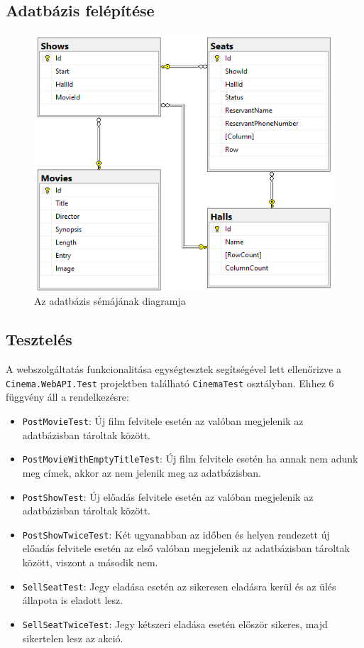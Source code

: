 \documentclass{article}
\begin{document}
	\subsection*{Adatbázis felépítése}
	\begin{figure}[H]
		\centering
				\includegraphics[width=\textwidth]{database}
		\caption{Az adatbázis sémájának diagramja}
	\end{figure}
	\subsection*{Tesztelés}
	A webszolgáltatás funkcionalitása egységtesztek segítségével lett ellenőrizve a \texttt{Cinema.WebAPI.Test} projektben található \texttt{CinemaTest} osztályban. Ehhez 6 függvény áll a rendelkezésre:
	\begin{itemize}
		\item \texttt{PostMovieTest}: Új film felvitele esetén az valóban megjelenik az adatbázisban tároltak között.
		\item \texttt{PostMovieWithEmptyTitleTest}: Új film felvitele esetén ha annak nem adunk meg címek, akkor az nem jelenik meg az adatbázisban.
		\item \texttt{PostShowTest}: Új előadás felvitele esetén az valóban megjelenik az adatbázisban tároltak között. 
		\item \texttt{PostShowTwiceTest}: Két ugyanabban az időben és helyen rendezett új előadás felvitele esetén az első valóban megjelenik az adatbázisban tároltak között, viszont a második nem.
		\item \texttt{SellSeatTest}: Jegy eladása esetén az sikeresen eladásra kerül és az ülés állapota is eladott lesz.
		\item \texttt{SellSeatTwiceTest}: Jegy kétszeri eladása esetén először sikeres, majd sikertelen lesz az akció.
	\end{itemize}
\end{document}
